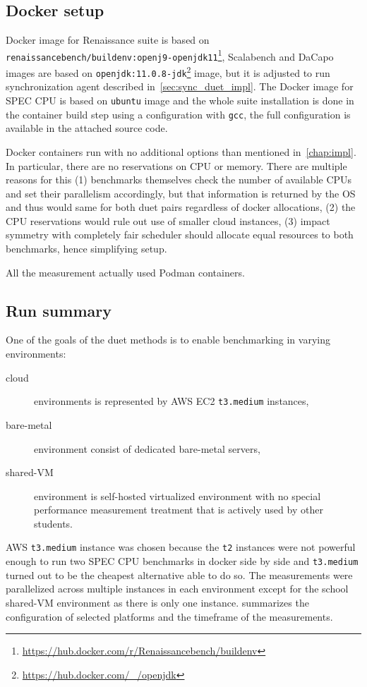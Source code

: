\subsection{Docker setup}
Docker image for Renaissance suite is based on \lstinline{renaissancebench/buildenv:openj9-openjdk11}\footnote{\url{https://hub.docker.com/r/Renaissancebench/buildenv}}, Scalabench and DaCapo images are based on \lstinline{openjdk:11.0.8-jdk}\footnote{\url{https://hub.docker.com/_/openjdk}} image, but it is adjusted to run synchronization agent described in~\cref{sec:sync_duet_impl}.
The Docker image for SPEC CPU is based on \lstinline{ubuntu} image and the whole suite installation is done in the container build step using a configuration with \lstinline{gcc}, the full configuration is available in the attached source code.

Docker containers run with no additional options than mentioned in~\cref{chap:impl}.
In particular, there are no reservations on CPU or memory.
There are multiple reasons for this (1) benchmarks themselves check the number of available CPUs and set their parallelism accordingly, but that information is returned by the OS and thus would same for both duet pairs regardless of docker allocations, (2) the CPU reservations would rule out use of smaller cloud instances, (3) impact symmetry with completely fair scheduler should allocate equal resources to both benchmarks, hence simplifying setup.

All the measurement actually used Podman containers.

\subsection{Run summary}

One of the goals of the duet methods is to enable benchmarking in varying environments:
\begin{description}
	\item[cloud] environments is represented by AWS EC2 \lstinline{t3.medium} instances,
	\item[bare-metal] environment consist of dedicated \mbox{bare-metal} servers,
	\item[shared-VM] environment is \mbox{self-hosted} virtualized environment with no special performance measurement treatment that is actively used by other students.
\end{description}
AWS \lstinline{t3.medium} instance was chosen because the \lstinline{t2} instances were not powerful enough to run two SPEC CPU benchmarks in docker side by side and \lstinline{t3.medium} turned out to be the cheapest alternative able to do so.
The measurements were parallelized across multiple instances in each environment except for the school \mbox{shared-VM} environment as there is only one instance.
 summarizes the configuration of selected platforms and the timeframe of the measurements.

